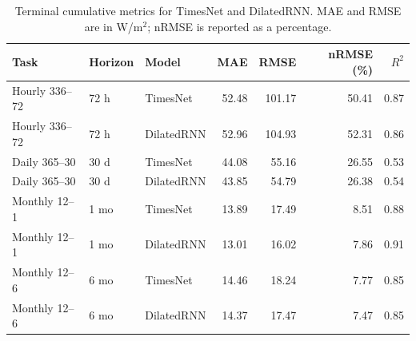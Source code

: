\begin{table}[htbp]
\centering
\caption{Terminal cumulative metrics for TimesNet and DilatedRNN. MAE and RMSE are in W/m$^2$; nRMSE is reported as a percentage.}
\label{tab:metricas-terminais}
\small
\setlength{\tabcolsep}{5pt}
\begin{tabular}{ll l rrrr}
\toprule
Task & Horizon & Model & MAE & RMSE & nRMSE (\%) & $R^2$ \\
\midrule
Hourly 336--72 & 72 h & TimesNet & 52.48 & 101.17 & 50.41 & 0.87 \\
Hourly 336--72 & 72 h & DilatedRNN & 52.96 & 104.93 & 52.31 & 0.86 \\
\addlinespace
Daily 365--30 & 30 d & TimesNet & 44.08 & 55.16 & 26.55 & 0.53 \\
Daily 365--30 & 30 d & DilatedRNN & 43.85 & 54.79 & 26.38 & 0.54 \\
\addlinespace
Monthly 12--1 & 1 mo & TimesNet & 13.89 & 17.49 & 8.51 & 0.88 \\
Monthly 12--1 & 1 mo & DilatedRNN & 13.01 & 16.02 & 7.86 & 0.91 \\
\addlinespace
Monthly 12--6 & 6 mo & TimesNet & 14.46 & 18.24 & 7.77 & 0.85 \\
Monthly 12--6 & 6 mo & DilatedRNN & 14.37 & 17.47 & 7.47 & 0.85 \\
\bottomrule
\end{tabular}
\end{table}
